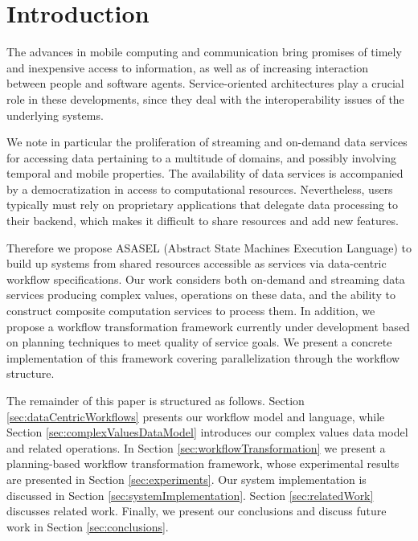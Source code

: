 	
\section{Introduction}\label{sec:asasel:intro}

The advances in mobile computing and communication bring promises of timely and inexpensive access to information, as well as of increasing interaction between people and software agents. Service-oriented architectures play a crucial role in these developments, since they  deal with the interoperability issues of the underlying systems.

We note in particular the proliferation of streaming and on-demand data services for accessing data pertaining to a multitude of domains, and possibly involving temporal and mobile properties. The availability of data services is accompanied by a democratization in access to computational resources. Nevertheless, users typically must rely on proprietary applications that delegate data processing to their backend, which makes it difficult to share resources and add new features.	
	
Therefore we propose ASASEL (Abstract State Machines Execution Language) to build up systems from shared resources accessible as services via data-centric workflow specifications. Our work considers both on-demand and streaming data services producing complex values, operations on these data, and the ability to construct composite computation services to process them. In addition, we propose a workflow transformation framework currently under development based on planning techniques to meet quality of service goals. We present a concrete implementation of this framework covering parallelization through the workflow structure.

The remainder of this paper is structured as follows. Section \ref{sec:dataCentricWorkflows} presents our workflow model and language, while Section \ref{sec:complexValuesDataModel} introduces our complex values data model and related operations. In Section \ref{sec:workflowTransformation} we present a planning-based workflow transformation framework, whose experimental results are presented in Section \ref{sec:experiments}. Our system implementation is discussed in Section \ref{sec:systemImplementation}. Section \ref{sec:relatedWork} discusses related work. Finally, we present our conclusions and discuss future work in Section \ref{sec:conclusions}.

 

